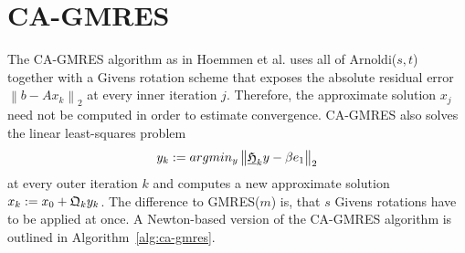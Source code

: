 \documentclass{scrartcl}
\numberwithin{equation}{section}
\newcommand{\norm}[1]{\left\lVert#1\right\rVert}
\begin{document}
\section{CA-GMRES} \label{sec:ca-gmres}
The CA-GMRES algorithm as in Hoemmen et al. \cite{Hoemmen:2010:CKS:1970638} uses all of Arnoldi($s,t$) together with a Givens rotation scheme that exposes the absolute residual error $\norm{b - Ax_k}_2$ at every inner iteration $j$. Therefore, the approximate solution $x_j$ need not be computed in order to estimate convergence. CA-GMRES also solves the linear least-squares problem 
\begin{equation*}
	y_k := argmin_y \norm{\underline{\frak{H}}_k y - \beta e_1}_2
\end{equation*}
at every outer iteration $k$ and computes a new approximate solution $x_k := x_0 + \frak{Q}_k y_k$. The difference to GMRES($m$) is, that $s$ Givens rotations have to be applied at once. A Newton-based version of the CA-GMRES algorithm is outlined in Algorithm~\ref{alg:ca-gmres}.

\end{document}
